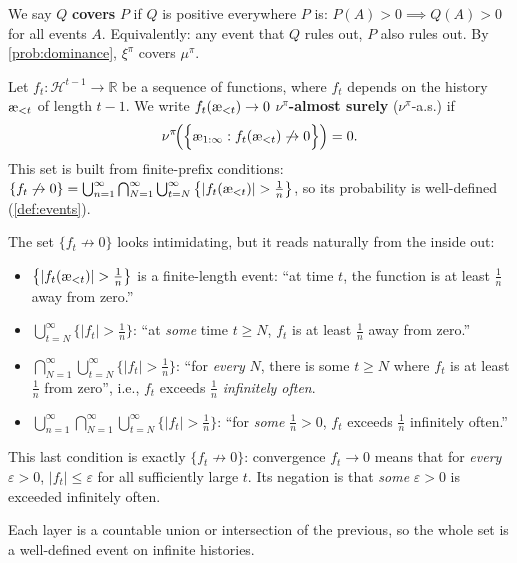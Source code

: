 \documentclass[fontsize=11pt, parskip=half]{scrartcl}
\newcommand{\cH}{\mathcal{H}}
\newcommand{\aes}{\textnormal{\ae}}
\begin{document}
\begin{definition}\label{def:covering}
We say $Q$ \textbf{covers} $P$ if $Q$ is positive everywhere $P$ is:
$P(A) > 0 \implies Q(A) > 0$ for all events $A$.
Equivalently: any event that $Q$ rules out, $P$ also rules out.
By \cref{prob:dominance}, $\xi^\pi$ covers $\mu^\pi$.
\end{definition}

\begin{definition}\label{def:as}
Let $f_t : \cH^{t-1} \to \mathbb{R}$ be a sequence of functions, where $f_t$ depends on the history $\aes_{<t}$ of length $t-1$. We write $f_t(\aes_{<t}) \to 0$ $\nu^\pi$\textbf{-almost surely} ($\nu^\pi$-a.s.) if
\[
    \nu^\pi\!\Big(\Big\{\aes_{1:\infty} : f_t(\aes_{<t}) \not\to 0\Big\}\Big) = 0.
\]
This set is built from finite-prefix conditions:
$\{f_t \not\to 0\} = \bigcup_{n=1}^\infty \bigcap_{N=1}^\infty \bigcup_{t=N}^\infty \big\{|f_t(\aes_{<t})| > \tfrac{1}{n}\big\}$,
so its probability is well-defined (\cref{def:events}).
\end{definition}

\begin{example}
The set $\{f_t \not\to 0\}$ looks intimidating, but it reads naturally from the inside out:
\begin{itemize}\itemsep=4pt
    \item $\big\{|f_t(\aes_{<t})| > \tfrac{1}{n}\big\}$ is a finite-length event: ``at time $t$, the function is at least $\tfrac{1}{n}$ away from zero.''

    \item $\bigcup_{t=N}^\infty \big\{|f_t| > \tfrac{1}{n}\big\}$: ``at \emph{some} time $t \geq N$, $f_t$ is at least $\tfrac{1}{n}$ away from zero.''

    \item $\bigcap_{N=1}^\infty \bigcup_{t=N}^\infty \big\{|f_t| > \tfrac{1}{n}\big\}$: ``for \emph{every} $N$, there is some $t \geq N$ where $f_t$ is at least $\tfrac{1}{n}$ from zero'', i.e., $f_t$ exceeds $\tfrac{1}{n}$ \emph{infinitely often}.

    \item $\bigcup_{n=1}^\infty \bigcap_{N=1}^\infty \bigcup_{t=N}^\infty \big\{|f_t| > \tfrac{1}{n}\big\}$: ``for \emph{some} $\tfrac{1}{n} > 0$, $f_t$ exceeds $\tfrac{1}{n}$ infinitely often.''
\end{itemize}
This last condition is exactly $\{f_t \not\to 0\}$: convergence $f_t \to 0$ means that for \emph{every} $\varepsilon > 0$, $|f_t| \leq \varepsilon$ for all sufficiently large $t$. Its negation is that \emph{some} $\varepsilon > 0$ is exceeded infinitely often.

Each layer is a countable union or intersection of the previous, so the whole set is a well-defined event on infinite histories.
\end{example}
\end{document}
